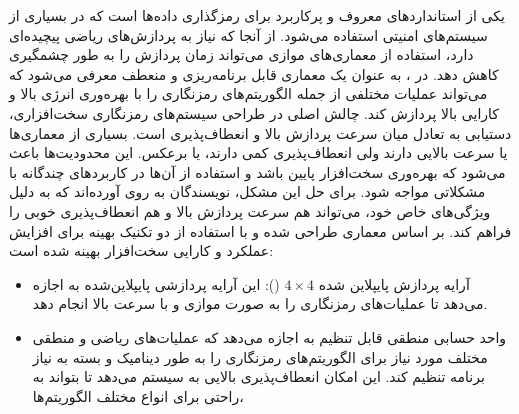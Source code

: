 \begin{qsolve}
\begin{enumerate}
	یکی از استانداردهای معروف و پرکاربرد برای رمزگذاری داده‌ها است که در بسیاری از سیستم‌های امنیتی استفاده می‌شود. از آنجا که  نیاز به پردازش‌های ریاضی پیچیده‌ای دارد، استفاده از معماری‌های موازی می‌تواند زمان پردازش را به طور چشمگیری کاهش دهد. در \cite{ref5}،  به عنوان یک معماری قابل برنامه‌ریزی و منعطف معرفی می‌شود که می‌تواند عملیات مختلفی از جمله الگوریتم‌های رمزنگاری را با بهره‌وری انرژی بالا و کارایی بالا پردازش کند. چالش اصلی در طراحی سیستم‌های رمزنگاری سخت‌افزاری، دستیابی به تعادل میان سرعت پردازش بالا و انعطاف‌پذیری است. بسیاری از معماری‌ها یا سرعت بالایی دارند ولی انعطاف‌پذیری کمی دارند، یا برعکس. این محدودیت‌ها باعث می‌شود که بهره‌وری سخت‌افزار پایین باشد و استفاده از آن‌ها در کاربردهای چندگانه  با مشکلاتی مواجه شود. برای حل این مشکل، نویسندگان به  روی آورده‌اند که به دلیل ویژگی‌های خاص خود، می‌تواند هم سرعت پردازش بالا و هم انعطاف‌پذیری خوبی را فراهم کند.  بر اساس معماری  طراحی شده و با استفاده از دو تکنیک بهینه برای افزایش عملکرد و کارایی سخت‌افزار بهینه شده است:
	\begin{itemize}
		\item 
		آرایه پردازش پایپلاین شده $4 \times 4 $ (): این آرایه پردازشی پایپلاین‌شده به  اجازه می‌دهد تا عملیات‌های رمزنگاری را به صورت موازی و با سرعت بالا انجام دهد.
		
		\item 
		واحد حسابی منطقی قابل تنظیم   به  اجازه می‌دهد که عملیات‌های ریاضی و منطقی مختلف مورد نیاز برای الگوریتم‌های رمزنگاری را به طور دینامیک و بسته به نیاز برنامه تنظیم کند. این امکان انعطاف‌پذیری بالایی به سیستم می‌دهد تا بتواند به راحتی برای انواع مختلف الگوریتم‌ها، 
	\end{itemize}
	\end{enumerate}
\end{qsolve}



